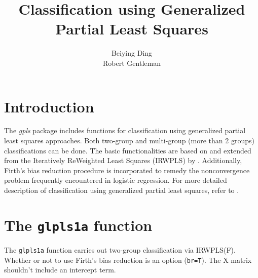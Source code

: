 \documentclass[11pt]{article}
\newcommand{\Rfunction}[1]{{\texttt{#1}}}
\newcommand{\Rpackage}[1]{{\textit{#1}}}
\begin{document}
\title{Classification using Generalized Partial Least Squares}
\author{Beiying Ding\\ Robert Gentleman}
\maketitle

\section*{Introduction}
The \Rpackage{gpls} package includes functions for classification using
generalized partial least squares approaches. Both two-group and
multi-group (more than 2 groups) classifications can be done. The
basic functionalities are based on and extended from the Iteratively
ReWeighted Least Squares (IRWPLS) by \citet{marx:1996}. Additionally,
Firth's bias reduction procedure \citep{firth:1992:a, firth:1992:b,
  firth:1993} is incorporated to remedy the nonconvergence problem
frequently encountered in logistic regression. For more detailed
description of classification using generalized partial least squares,
refer to \citet{ding:2003:c}.\\

\section*{The \Rfunction{glpls1a} function}
The \Rfunction{glpls1a} function carries out two-group classification via
IRWPLS(F). Whether or not to use Firth's bias reduction is an option
({\tt br=T}). The X matrix shouldn't include an intercept term.\\
\end{document}
